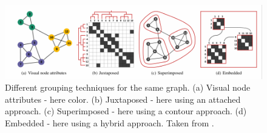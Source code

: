 \begin{figure}
    \centering
    \includegraphics[scale=0.5]{media/group_vis.pdf}
    \caption{Different grouping techniques for the same graph. (a) Visual node attributes - here color. (b) Juxtaposed - here using an attached approach. (c) Superimposed - here using a contour approach. (d) Embedded - here using a hybrid approach. Taken from \cite{Vehlow2015}.}
    \label{fig:group_vis}
\end{figure}
